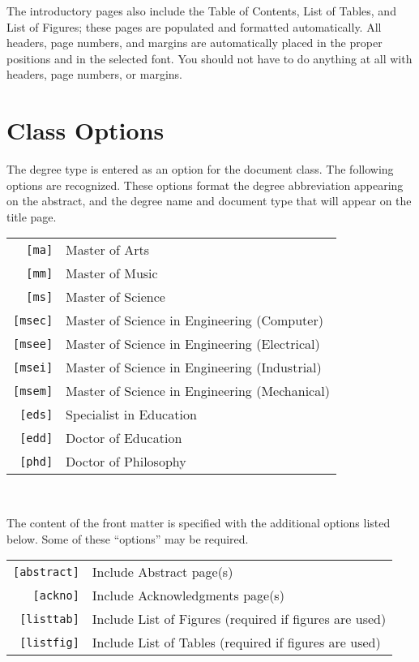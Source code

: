 \documentclass{wmu-thesis}
\begin{document}
The introductory pages also include the Table of Contents, List of Tables, and List of Figures; these pages are populated and formatted automatically.  All headers, page numbers, and margins are automatically placed in the proper positions and in the selected font.  You should not have to do anything at all with headers, page numbers, or margins.

\section*{Class Options}
The degree type is entered as an option for the document class.  The following options are recognized.  These options format the degree abbreviation appearing on the abstract, and the degree name and document type that will appear on the title page.\\
\begin{center}
\begin{tabular}{rl}
\texttt{[ma]}   &Master of Arts\\
\texttt{[mm]}   &Master of Music\\
\texttt{[ms]}   &Master of Science\\
\texttt{[msec]} &Master of Science in Engineering (Computer)\\
\texttt{[msee]} &Master of Science in Engineering (Electrical)\\
\texttt{[msei]} &Master of Science in Engineering (Industrial)\\
\texttt{[msem]} &Master of Science in Engineering (Mechanical)\\
\texttt{[eds]}  &Specialist in Education\\
\texttt{[edd]}  &Doctor of Education\\
\texttt{[phd]}  &Doctor of Philosophy\\
\end{tabular}\\
\end{center}

The content of the front matter is specified with the additional options listed below.  Some of these ``options'' may be required.\\
\begin{center}
\begin{tabular}{rl}
\texttt{[abstract]} &Include Abstract page(s)\\
\texttt{[ackno]}    &Include Acknowledgments page(s)\\
\texttt{[listtab]}  &Include List of Figures (required if figures are used)\\
\texttt{[listfig]}  &Include List of Tables (required if figures are used)\\
\end{tabular}\\
\end{center}
\end{document}

